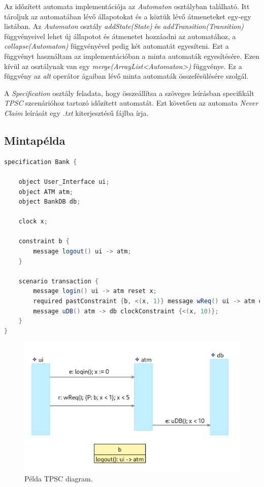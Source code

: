 Az időzített automata implementációja az \textit{Automaton} osztályban található.
Itt tároljuk az automatában lévő állapotokat és a köztük lévő átmeneteket egy-egy listában.
Az \textit{Automaton} osztály \textit{addState(State)} és \textit{addTransition(Transition)} függvényeivel lehet új állapotot és átmenetet hozzáadni az automatához, a \textit{collapse(Automaton)} függvényével pedig két automatát egyesíteni.
Ezt a függvényt használtam az implementációban a minta automaták egyesítésére.
Ezen kívül az osztálynak van egy \textit{merge(ArrayList<Automaton>)} függvénye.
Ez a függvény az \textit{alt} operátor ágaiban lévő minta automaták összefésülésére szolgál.

A \textit{Specification} osztály feladata, hogy összeállítsa a szöveges leírásban specifikált \textit{TPSC} szcenárióhoz tartozó időzített automatát.
Ezt követően az automata \textit{Never Claim} leírását egy \textit{.txt} kiterjesztésű fájlba írja.

\subsection{Mintapélda}

\begin{lstlisting}[language=java,frame=single, float=h!, caption={TPSC scenario szöveges leírása.},captionpos=b,label=tpsc_example_text]
specification Bank {

	object User_Interface ui;
	object ATM atm;
	object BankDB db;

	clock x;

	constraint b {
		message logout() ui -> atm;
	}

	scenario transaction {
		message login() ui -> atm reset x;
		required pastConstraint {b, <(x, 1)} message wReq() ui -> atm clockConstraint {<(x, 5)};
		message uDB() atm -> db clockConstraint {<(x, 10)};
	}
}
\end{lstlisting}

\begin{figure}[h!]
    \centering
    \includegraphics[width=130mm, keepaspectratio]{figures/tpsc_automaton_generator_sirius.png}
    \caption{Példa TPSC diagram.}
	\label{tpsc_example_diagram}
\end{figure}

